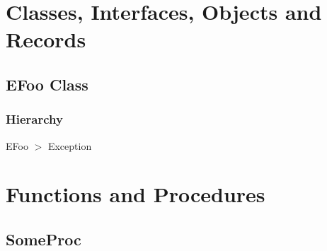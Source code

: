 \documentclass{report}
\newif\ifpdf
\begin{document}
\section{Classes, Interfaces, Objects and Records}
\ifpdf
\subsection*{\large{\textbf{EFoo Class}}\normalsize\hspace{1ex}\hrulefill}
\else
\subsection*{EFoo Class}
\fi
\label{ok_tag_params_no_parens.EFoo}
\subsubsection*{\large{\textbf{Hierarchy}}\normalsize\hspace{1ex}\hfill}
EFoo {$>$} Exception
\section{Functions and Procedures}
\ifpdf
\subsection*{\large{\textbf{SomeProc}}\normalsize\hspace{1ex}\hrulefill}
\else
\end{document}
